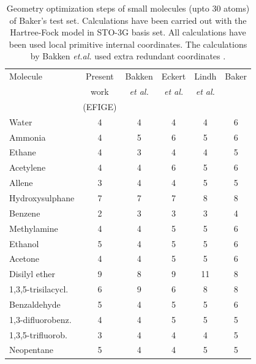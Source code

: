 \documentclass[prl,twocolumn,showpacs,twocolumngrid,superbib]{revtex4}
\begin{document}
\begin{table}[h]
\caption{
Geometry optimization steps of small molecules (upto 30 atoms)
of Baker's test set. Calculations have been carried out 
with the Hartree-Fock model in STO-3G basis set.
All calculations have been used local primitive
internal coordinates. The calculations 
by Bakken {\it et.al.} used extra redundant coordinates \cite{bakken}.
}
\label{Bakers_test}
\begin{tabular}{lccccc}
\toprule
Molecule               & Present  & Bakken & Eckert  & Lindh &  Baker  \\
         & work & {\it{et al.}} & {\it{et al.}} & {\it{et al.}} &    \\
         &(EFIGE) &  \cite{bakken} &  \cite{eckert} & \cite{lindh} &  \cite{bakerstest} \\
\colrule
Water                  &   4    &   4    &    4    &    4   &   6     \\
Ammonia                &   4    &   5    &    6    &    5   &   6     \\
Ethane                 &   4    &   3    &    4    &    4   &   5     \\
Acetylene              &   4    &   4    &    6    &    5   &   6     \\
Allene                 &   3    &   4    &    4    &    5   &   5     \\
Hydroxysulphane        &   7    &   7    &    7    &    8   &   8     \\
Benzene                &   2    &   3    &    3    &    3   &   4     \\
Methylamine            &   4    &   4    &    5    &    5   &   6     \\
Ethanol                &   5    &   4    &    5    &    5   &   6     \\
Acetone                &   4    &   4    &    5    &    5   &   6     \\
Disilyl ether          &   9    &   8    &    9    &   11   &   8     \\
1,3,5-trisilacycl.     &   6    &   9    &    6    &    8   &   8     \\
Benzaldehyde           &   5    &   4    &    5    &    5   &   6     \\
1,3-difluorobenz.      &   4    &   4    &    5    &    5   &   5     \\
1,3,5-trifluorob.      &   3    &   4    &    4    &    4   &   5     \\
Neopentane             &   5    &   4    &    4    &    5   &   5     \\

\end{tabular}
\end{table}
\end{document}
